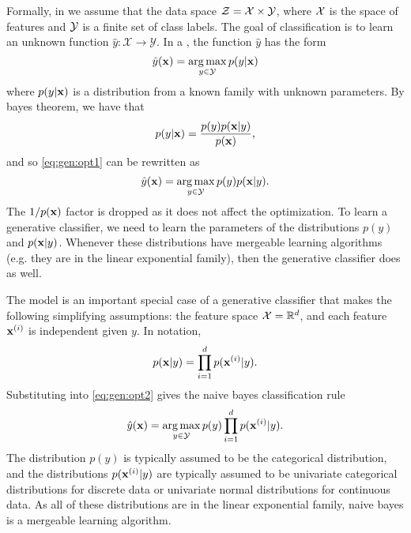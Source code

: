 \documentclass[thesis.tex]{subfiles}
\newcommand{\set}[1]{\mathcal {#1}}
\begin{document}
Formally, in  we assume that the data space ${\mathcal Z}={\mathcal X}\times {\mathcal Y}$,
where ${\mathcal X}$ is the space of features and ${\mathcal Y}$ is a finite set of class labels.
The goal of classification is to learn an unknown function $\hat y : \set X \to \set Y$.
In a , the function $\hat y$ has the form
\begin{equation}
    \label{eq:gen:opt1}
    \hat y(\mathbf{x}) 
    =
    \operatorname*{arg\,max}_{y\in{\mathcal Y}} p(y | \mathbf{x})
    \end{equation}
where $p(y | \mathbf{x})$ is a distribution from a known family with unknown parameters.
By bayes theorem, we have that
\begin{equation}
    \label{eq:gen:bayes}
    p(y | \mathbf{x}) = \frac{p(y)p(\mathbf{x} | y)}{p(\mathbf{x})}
    ,
\end{equation}
and so \eqref{eq:gen:opt1} can be rewritten as
\begin{equation}
    \label{eq:gen:opt2}
    \hat y(\mathbf{x}) 
    =
    \operatorname*{arg\,max}_{y\in{\mathcal Y}} p(y)p(\mathbf{x} | y)
    .
\end{equation}
The $1/p(\mathbf{x})$ factor is dropped as it does not affect the optimization.
To learn a generative classifier,
we need to learn the parameters of the distributions $p(y)$ and $p(\mathbf{x}|y)$.
Whenever these distributions have mergeable learning algorithms 
(e.g. they are in the linear exponential family),
then the generative classifier does as well.

The  model is an important special case of a generative classifier that makes the following simplifying assumptions:
the feature space ${\mathcal X}=\mathbb R^d$, 
and each feature $\mathbf{x}^{(i)}$ is independent given $y$.
In notation,
\begin{equation}
    p(\mathbf{x}|y) = \prod_{i=1}^d p(\mathbf{x}^{(i)}|y)
    .
\end{equation}
Substituting into \eqref{eq:gen:opt2} gives the naive bayes classification rule
\begin{equation}
    \label{eq:gen:nb}
    \hat y(\mathbf{x}) 
    =
    \operatorname*{arg\,max}_{y\in{\mathcal Y}} p(y)\prod_{i=1}^dp(\mathbf{x}^{(i)} | y)
    .
\end{equation}
The distribution $p(y)$ is typically assumed to be the categorical distribution,
and the distributions $p(\mathbf{x}^{(i)}|y)$ are typically assumed to be univariate categorical distributions for discrete data or univariate normal distributions for continuous data.
As all of these distributions are in the linear exponential family,
naive bayes is a mergeable learning algorithm.
\end{document}
